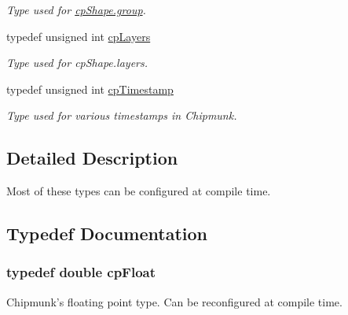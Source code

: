 \begin{DoxyCompactItemize}
\begin{DoxyCompactList}\small\item\em Type used for \hyperlink{structcp_shape_a2e6aaffa5f4107eda1718e4f69628fc1}{cp\-Shape.\-group}. \end{DoxyCompactList}\item 
\hypertarget{group__basic_types_ga5ec31e87ed3973cab80f9bfbbbcb43bb}{typedef unsigned int \hyperlink{group__basic_types_ga5ec31e87ed3973cab80f9bfbbbcb43bb}{cp\-Layers}}\label{group__basic_types_ga5ec31e87ed3973cab80f9bfbbbcb43bb}

\begin{DoxyCompactList}\small\item\em Type used for cp\-Shape.\-layers. \end{DoxyCompactList}\item 
\hypertarget{group__basic_types_gaa24652c104082d0725066ea5ac7dc83f}{typedef unsigned int \hyperlink{group__basic_types_gaa24652c104082d0725066ea5ac7dc83f}{cp\-Timestamp}}\label{group__basic_types_gaa24652c104082d0725066ea5ac7dc83f}

\begin{DoxyCompactList}\small\item\em Type used for various timestamps in Chipmunk. \end{DoxyCompactList}\end{DoxyCompactItemize}


\subsection{Detailed Description}
Most of these types can be configured at compile time. 

\subsection{Typedef Documentation}
\hypertarget{group__basic_types_gac1ed65573e035bf892505768c852d8d3}{
\subsubsection[{cp\-Float}]{\setlength{\rightskip}{0pt plus 5cm}typedef double {\bf cp\-Float}}}\label{group__basic_types_gac1ed65573e035bf892505768c852d8d3}
Chipmunk's floating point type. Can be reconfigured at compile time. 